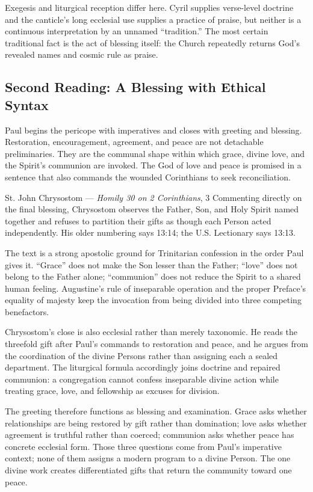 Exegesis and liturgical reception differ here. Cyril supplies verse-level doctrine and the canticle's long ecclesial use supplies a practice of praise, but neither is a continuous interpretation by an unnamed “tradition.” The most certain traditional fact is the act of blessing itself: the Church repeatedly returns God's revealed names and cosmic rule as praise.

\subsection*{Second Reading: A Blessing with Ethical Syntax\enspace{}}

Paul begins the pericope with imperatives and closes with greeting and blessing. Restoration, encouragement, agreement, and peace are not detachable preliminaries. They are the communal shape within which grace, divine love, and the Spirit's communion are invoked. The God of love and peace is promised in a sentence that also commands the wounded Corinthians to seek reconciliation.

\begin{sourcecard}{St. John Chrysostom --- \emph{Homily 30 on 2 Corinthians}, 3}
Commenting directly on the final blessing, Chrysostom observes the Father, Son, and Holy Spirit named together and refuses to partition their gifts as though each Person acted independently. His older numbering says 13:14; the U.S. Lectionary says 13:13.
\end{sourcecard}

The text is a strong apostolic ground for Trinitarian confession in the order Paul gives it. “Grace” does not make the Son lesser than the Father; “love” does not belong to the Father alone; “communion” does not reduce the Spirit to a shared human feeling. Augustine's rule of inseparable operation and the proper Preface's equality of majesty keep the invocation from being divided into three competing benefactors.

Chrysostom's close is also ecclesial rather than merely taxonomic. He reads the threefold gift after Paul's commands to restoration and peace, and he argues from the coordination of the divine Persons rather than assigning each a sealed department. The liturgical formula accordingly joins doctrine and repaired communion: a congregation cannot confess inseparable divine action while treating grace, love, and fellowship as excuses for division.

The greeting therefore functions as blessing and examination. Grace asks whether relationships are being restored by gift rather than domination; love asks whether agreement is truthful rather than coerced; communion asks whether peace has concrete ecclesial form. Those three questions come from Paul's imperative context; none of them assigns a modern program to a divine Person. The one divine work creates differentiated gifts that return the community toward one peace.

